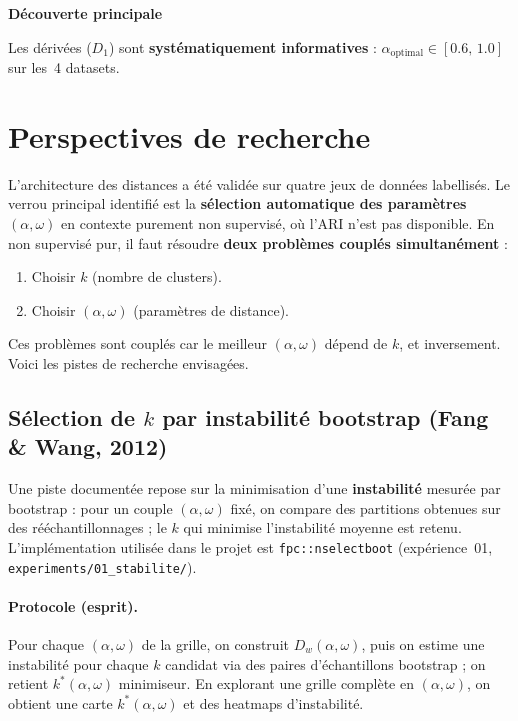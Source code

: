 \documentclass[11pt, a4paper]{article}
\newcommand{\Dw}{D_w}
\newenvironment{resultbox}[1][]{%
  \def\FrameCommand{\fboxsep=8pt \fcolorbox{resultborder}{resultbox}}%
  \MakeFramed{\advance\hsize-\width \FrameRestore}%
  \noindent\textbf{#1}\par\smallskip\noindent\ignorespaces
}{\endMakeFramed}
\begin{document}
\begin{resultbox}[Découverte principale]
Les dérivées ($D_1$) sont \textbf{systématiquement informatives} :
$\alpha_{\text{optimal}} \in [0.6,\, 1.0]$ sur les~4 datasets.
\end{resultbox}

\newpage
\section{Perspectives de recherche}
\label{sec:perspectives}

L'architecture des distances a été validée sur quatre jeux de données
labellisés. Le verrou principal identifié est la \textbf{sélection
automatique des paramètres} $(\alpha, \omega)$ en contexte purement non
supervisé, où l'ARI n'est pas disponible. En non supervisé pur, il faut
résoudre \textbf{deux problèmes couplés simultanément} :
\begin{enumerate}[nosep]
  \item Choisir $k$ (nombre de clusters).
  \item Choisir $(\alpha, \omega)$ (paramètres de distance).
\end{enumerate}
Ces problèmes sont couplés car le meilleur $(\alpha, \omega)$ dépend de $k$,
et inversement. Voici les pistes de recherche envisagées.

\subsection{Sélection de $k$ par instabilité bootstrap (Fang \& Wang, 2012)}

Une piste documentée repose sur la minimisation d'une \textbf{instabilité}
mesurée par bootstrap \cite{fang2012} : pour un couple $(\alpha,\omega)$ fixé,
on compare des partitions obtenues sur des rééchantillonnages ; le $k$ qui
minimise l'instabilité moyenne est retenu. L'implémentation utilisée dans le
projet est \texttt{fpc::nselectboot} (expérience~01,
\texttt{experiments/01\_stabilite/}).

\paragraph{Protocole (esprit).}
Pour chaque $(\alpha,\omega)$ de la grille, on construit $\Dw(\alpha,\omega)$,
puis on estime une instabilité pour chaque $k$ candidat via des paires
d'échantillons bootstrap ; on retient $k^*(\alpha,\omega)$ minimiseur. En
explorant une grille complète en $(\alpha,\omega)$, on obtient une carte
$k^*(\alpha,\omega)$ et des heatmaps d'instabilité.
\end{document}
